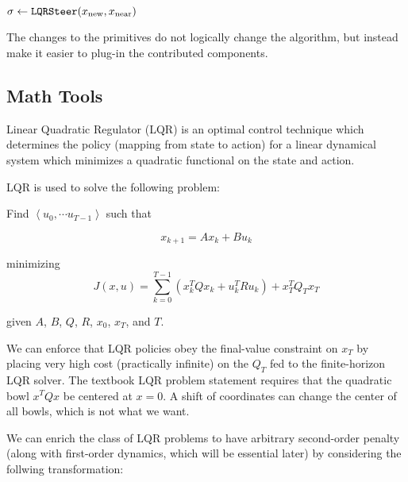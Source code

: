 \documentclass[letterpaper, 10pt, english, conference]{IEEEtran}
\begin{document}
\begin{center}
\begin{algorithm}
 {
    $\sigma \leftarrow {\tt LQRSteer}(x_\mathrm{new}, x_\mathrm{near})$ \;
}
\;
\caption{${\tt Rewire}( \, (V,E), X_\mathrm{near}, x_\mathrm{new} \, )$}
\end{algorithm}
\end{center}

The changes to the primitives do not logically change the \rrtstar algorithm,
but instead make it easier to plug-in the contributed components.


\subsection{Math Tools}

Linear Quadratic Regulator (LQR) is an optimal control technique which
determines the policy (mapping from state to action) for a linear
dynamical system which minimizes a quadratic functional on the state
and action.

LQR is used to solve the following problem: 

Find $\left\langle u_{0},\cdots u_{T-1}\right\rangle $ such that 

\[
x_{k+1}=Ax_{k}+Bu_{k}
\]


minimizing 
\[
J\left(x,u\right)=\sum_{k=0}^{T-1}\left(x_{k}^{T}Qx_{k}+u_{k}^{T}Ru_{k}\right)+x_{T}^{T}Q_{T}x_{T}
\]


given $A$, $B$, $Q$, $R$, $x_{0}$, $x_{T}$, and $T$.

We can enforce that LQR policies obey the final-value constraint on
$x_{T}$ by placing very high cost (practically infinite) on the $Q_{T}$
fed to the finite-horizon LQR solver. The textbook LQR problem statement
requires that the quadratic bowl $x^{T}Qx$ be centered at $x=0$.
A shift of coordinates can change the center of all bowls, which is
not what we want.

We can enrich the class of LQR problems to have arbitrary second-order
penalty (along with first-order dynamics, which will be essential
later) by considering the follwing transformation:
\end{document}
